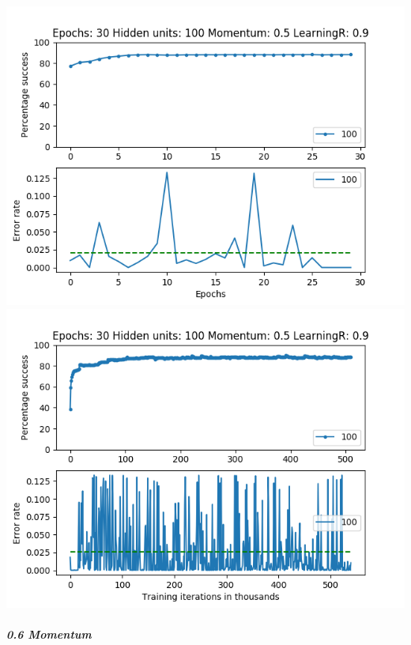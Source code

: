 \documentclass[11pt]{article}
\makeatletter
\def\maxwidth{\ifdim\Gin@nat@width>\linewidth\linewidth
    \else\Gin@nat@width\fi}
\let\Oldincludegraphics\includegraphics
\renewcommand{\includegraphics}[1]{\Oldincludegraphics[width=.8\maxwidth]{#1}}
\makeatother
\begin{document}
\includegraphics{Experiment2/E2_NN_Epoch_Momentum_0.5_30Epochs_100Hiddenunits.png}
\includegraphics{Experiment2/E2_NN_Training_Momentum_0.5_30Epochs_100Hiddenunits.png}

\hypertarget{momentum-6}{%
\subparagraph{0.6 Momentum}\label{momentum-6}}
\end{document}
